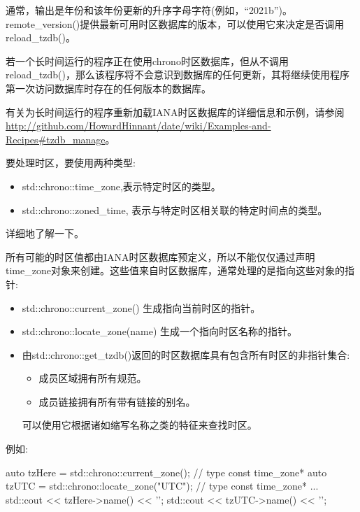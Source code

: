 通常，输出是年份和该年份更新的升序字母字符(例如，“2021b”)。remote\_version()提供最新可用时区数据库的版本，可以使用它来决定是否调用reload\_tzdb()。

若一个长时间运行的程序正在使用chrono时区数据库，但从不调用reload\_tzdb()，那么该程序将不会意识到数据库的任何更新，其将继续使用程序第一次访问数据库时存在的任何版本的数据库。

有关为长时间运行的程序重新加载IANA时区数据库的详细信息和示例，请参阅\url{http://github.com/HowardHinnant/date/wiki/Examples-and-Recipes#tzdb_manage}。


要处理时区，要使用两种类型:

\begin{itemize}
\item 
std::chrono::time\_zone,表示特定时区的类型。

\item 
std::chrono::zoned\_time, 表示与特定时区相关联的特定时间点的类型。
\end{itemize}

详细地了解一下。


所有可能的时区值都由IANA时区数据库预定义，所以不能仅仅通过声明time\_zone对象来创建。这些值来自时区数据库，通常处理的是指向这些对象的指针:

\begin{itemize}
\item 
std::chrono::current\_zone() 生成指向当前时区的指针。

\item 
std::chrono::locate\_zone(name) 生成一个指向时区名称的指针。

\item 
由std::chrono::get\_tzdb()返回的时区数据库具有包含所有时区的非指针集合:

\begin{itemize}
\item 
成员区域拥有所有规范。

\item 
成员链接拥有所有带有链接的别名。
\end{itemize}

可以使用它根据诸如缩写名称之类的特征来查找时区。
\end{itemize}

例如:

\begin{cpp}
auto tzHere = std::chrono::current_zone(); // type const time_zone*
auto tzUTC = std::chrono::locate_zone("UTC"); // type const time_zone*
...
std::cout << tzHere->name() << '\n';
std::cout << tzUTC->name() << '\n';
\end{cpp}

